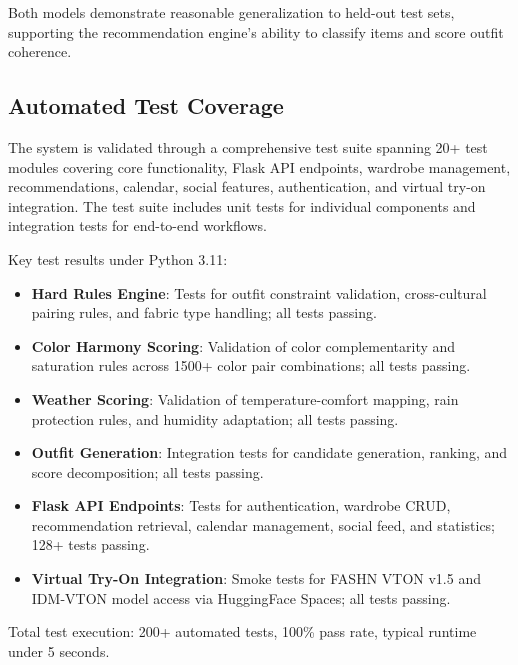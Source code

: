\documentclass[stu,man]{apa7}
\begin{document}
Both models demonstrate reasonable generalization to held-out test sets, supporting the recommendation engine's ability to classify items and score outfit coherence.

\subsection{Automated Test Coverage}
The system is validated through a comprehensive test suite spanning 20+ test modules covering core functionality, Flask API endpoints, wardrobe management, recommendations, calendar, social features, authentication, and virtual try-on integration. The test suite includes unit tests for individual components and integration tests for end-to-end workflows.

Key test results under Python 3.11:
\begin{itemize}
  \item \textbf{Hard Rules Engine}: Tests for outfit constraint validation, cross-cultural pairing rules, and fabric type handling; all tests passing.
  \item \textbf{Color Harmony Scoring}: Validation of color complementarity and saturation rules across 1500+ color pair combinations; all tests passing.
  \item \textbf{Weather Scoring}: Validation of temperature-comfort mapping, rain protection rules, and humidity adaptation; all tests passing.
  \item \textbf{Outfit Generation}: Integration tests for candidate generation, ranking, and score decomposition; all tests passing.
  \item \textbf{Flask API Endpoints}: Tests for authentication, wardrobe CRUD, recommendation retrieval, calendar management, social feed, and statistics; 128+ tests passing.
  \item \textbf{Virtual Try-On Integration}: Smoke tests for FASHN VTON v1.5 and IDM-VTON model access via HuggingFace Spaces; all tests passing.
\end{itemize}

Total test execution: 200+ automated tests, 100\% pass rate, typical runtime under 5 seconds.
\end{document}
